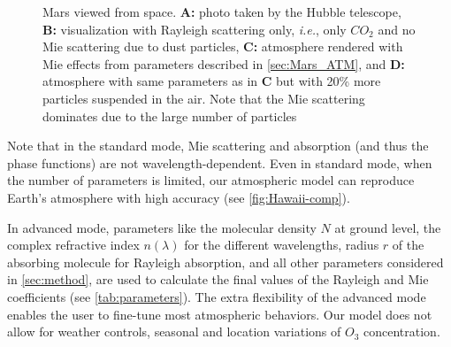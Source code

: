 \documentclass[journal]{vgtc}                %
\begin{document}
\begin{figure} 
 \centering
  \vspace*{-7mm}
  \caption{Mars viewed from space. \textbf{A:} photo taken by the Hubble telescope, \textbf{B:} visualization with Rayleigh scattering only, \textit{i.e.}, only $CO_2$ and no Mie scattering due to dust particles, \textbf{C:} atmosphere rendered with Mie effects from parameters described in \autoref{sec:Mars_ATM}, and \textbf{D:} atmosphere with same parameters as in \textbf{C} but with 20\% more particles suspended in the air. Note that the Mie scattering dominates due to the large number of particles}
 \label{fig:Mars-Ray-Mie}
 \vspace*{-2mm}
\end{figure}
%
Note that in the standard mode, Mie scattering and absorption (and thus the phase functions) are not wavelength-dependent. Even in standard mode, when the number of parameters is limited, our atmospheric model can reproduce Earth's atmosphere with high accuracy (see \autoref{fig:Hawaii-comp}). 

In advanced mode, parameters like the molecular density $N$ at ground level, the complex refractive index $n(\lambda)$ for the different wavelengths, radius $r$ of the absorbing molecule for Rayleigh absorption, and all other parameters considered in \autoref{sec:method}, are used to calculate the final values of the Rayleigh and Mie coefficients (see \autoref{tab:parameters}).
%
The extra flexibility of the advanced mode enables the user to fine-tune most atmospheric behaviors. Our model does not allow for weather controls, seasonal and location variations of $O_3$ concentration.
\end{document}
